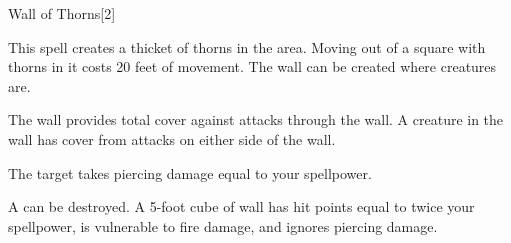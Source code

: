 \begin{spellsection}{Wall of Thorns}[2]
    \begin{spellheader}
    \end{spellheader}
    \begin{spellcontent}
        \begin{spelltargetinginfo}
        \end{spelltargetinginfo}
        \begin{spelleffects}
            \spelleffect This spell creates a thicket of thorns in the area. Moving out of a square with thorns in it costs 20 feet of movement. The wall can be created where creatures are.


            The wall provides total cover against attacks through the wall. A creature in the wall has cover from attacks on either side of the wall.
            \spelldur \durshort
        \end{spelleffects}
    \end{spellcontent}
    \begin{spellsubcontent}
        \begin{spelltargetinginfo}
        \end{spelltargetinginfo}
        \begin{spelleffects}
            \spelleffect The target takes piercing damage equal to your spellpower.
        \end{spelleffects}
    \end{spellsubcontent}
    \begin{spellfooter}
        \spellnotes A  can be destroyed. A 5-foot cube of wall has hit points equal to twice your spellpower, is vulnerable to fire damage, and ignores piercing damage.
        \physicalspellnotes
        \miscastexplode
    \end{spellfooter}
    \begin{spellaugments}
    \end{spellaugments}
\end{spellsection}

